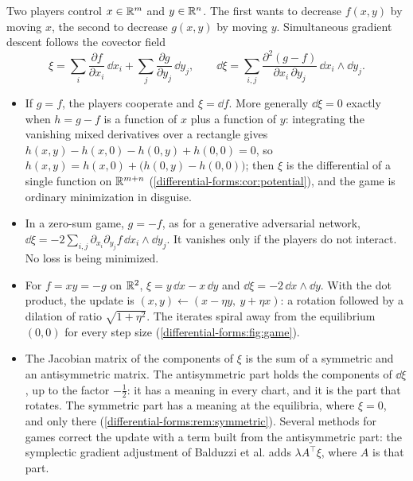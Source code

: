 \begin{notechapter}
\begin{mlthread}
Two players control $x\in\mathbb{R}^m$ and $y\in\mathbb{R}^n$. The first wants to
decrease $f(x, y)$ by moving $x$, the second to decrease $g(x, y)$ by
moving $y$. Simultaneous gradient descent follows the covector field
\[
  \xi = \sum_i\frac{\partial f}{\partial x_i}\,\dd x_i
      + \sum_j\frac{\partial g}{\partial y_j}\,\dd y_j ,
  \qquad
  \dd\xi = \sum_{i,j}\frac{\partial^2(g - f)}{\partial x_i\,\partial y_j}
  \,\dd x_i\wedge\dd y_j .
\]
\begin{itemize}[nosep]
  \item If $g = f$, the players cooperate and $\xi = \dd f$. More
        generally $\dd\xi = 0$ exactly when $h = g - f$ is a function
        of $x$ plus a function of $y$: integrating the vanishing mixed
        derivatives over a rectangle gives
        $h(x, y) - h(x, 0) - h(0, y) + h(0, 0) = 0$, so
        $h(x, y) = h(x, 0) + \bigl(h(0, y) - h(0, 0)\bigr)$; then
        $\xi$ is the differential of a
        single function on $\mathbb{R}^{m+n}$
        (\cref{differential-forms:cor:potential}), and the game is
        ordinary minimization in disguise.
  \item In a zero-sum game, $g = -f$, as for a generative adversarial
        network, $\dd\xi = -2\sum_{i,j}\partial_{x_i}\partial_{y_j}f\,
        \dd x_i\wedge\dd y_j$. It vanishes only if the players do not
        interact. No loss is being minimized.
  \item For $f = xy = -g$ on $\mathbb{R}^2$, $\xi = y\,\dd x - x\,\dd y$ and
        $\dd\xi = -2\,\dd x\wedge\dd y$. With the dot product, the
        update is $(x, y)\leftarrow(x - \eta y,\ y + \eta x)$: a
        rotation followed by a dilation of ratio $\sqrt{1 + \eta^2}$.
        The iterates spiral away from the equilibrium $(0, 0)$ for
        every step size (\cref{differential-forms:fig:game}).
  \item The Jacobian matrix of the components of $\xi$ is the sum of a
        symmetric and an antisymmetric matrix. The antisymmetric part
        holds the components of $\dd\xi$, up to the factor
        $-\frac12$: it has a meaning in every chart, and it is the
        part that rotates. The symmetric part has a meaning at the
        equilibria, where $\xi = 0$, and only there
        (\cref{differential-forms:rem:symmetric}). Several methods for
        games correct the update with a term built from the
        antisymmetric part: the symplectic gradient adjustment of
        Balduzzi et al. adds $\lambda A^\top\xi$, where $A$ is that
        part.
\end{itemize}
\end{mlthread}


\end{notechapter}
